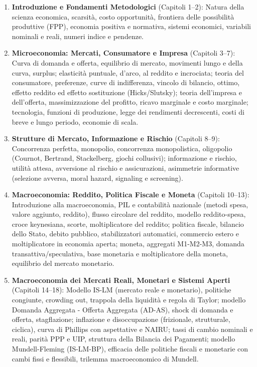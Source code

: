\documentclass[11pt,a4paper,twoside,openright]{book}
\begin{document}
\begin{enumerate}[label=\textbf{Parte \Roman*.}]
    \item \textbf{Introduzione e Fondamenti Metodologici} (Capitoli 1--2):
    Natura della scienza economica, scarsità, costo opportunità, frontiera delle possibilità produttive (FPP), economia positiva e normativa, sistemi economici, variabili nominali e reali, numeri indice e pendenze.
    
    \item \textbf{Microeconomia: Mercati, Consumatore e Impresa} (Capitoli 3--7):
    Curva di domanda e offerta, equilibrio di mercato, movimenti lungo e della curva, surplus; elasticità puntuale, d'arco, al reddito e incrociata; teoria del consumatore, preferenze, curve di indifferenza, vincolo di bilancio, ottimo, effetto reddito ed effetto sostituzione (Hicks/Slutsky); teoria dell'impresa e dell'offerta, massimizzazione del profitto, ricavo marginale e costo marginale; tecnologia, funzioni di produzione, legge dei rendimenti decrescenti, costi di breve e lungo periodo, economie di scala.
    
    \item \textbf{Strutture di Mercato, Informazione e Rischio} (Capitoli 8--9):
    Concorrenza perfetta, monopolio, concorrenza monopolistica, oligopolio (Cournot, Bertrand, Stackelberg, giochi collusivi); informazione e rischio, utilità attesa, avversione al rischio e assicurazioni, asimmetrie informative (selezione avversa, moral hazard, signaling e screening).
    
    \item \textbf{Macroeconomia: Reddito, Politica Fiscale e Moneta} (Capitoli 10--13):
    Introduzione alla macroeconomia, PIL e contabilità nazionale (metodi spesa, valore aggiunto, reddito), flusso circolare del reddito, modello reddito-spesa, croce keynesiana, scorte, moltiplicatore del reddito; politica fiscale, bilancio dello Stato, debito pubblico, stabilizzatori automatici, commercio estero e moltiplicatore in economia aperta; moneta, aggregati M1-M2-M3, domanda transattiva/speculativa, base monetaria e moltiplicatore della moneta, equilibrio del mercato monetario.
    
    \item \textbf{Macroeconomia dei Mercati Reali, Monetari e Sistemi Aperti} (Capitoli 14--18):
    Modello IS-LM (mercato reale e monetario), politiche congiunte, crowding out, trappola della liquidità e regola di Taylor; modello Domanda Aggregata - Offerta Aggregata (AD-AS), shock di domanda e offerta, stagflazione; inflazione e disoccupazione (frizionale, strutturale, ciclica), curva di Phillips con aspettative e NAIRU; tassi di cambio nominali e reali, parità PPP e UIP, struttura della Bilancia dei Pagamenti; modello Mundell-Fleming (IS-LM-BP), efficacia delle politiche fiscali e monetarie con cambi fissi e flessibili, trilemma macroeconomico di Mundell.
\end{enumerate}
\end{document}
